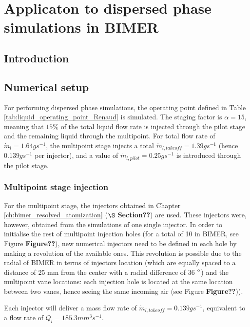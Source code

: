 \chapter{Applicaton to dispersed phase simulations in BIMER}
	\label{ch:bimer_test_bench}

\section{Introduction}

\section{Numerical setup}

For performing dispersed phase simulations, the operating point defined in Table \ref{tab:liquid_operating_point_Renaud} is simulated. The staging factor is $\alpha = 15$, meaning that $15 \%$ of the total liquid flow rate is injected through the pilot stage and the remaining liquid through the multipoint. For total flow rate of $\dot{m}_l = 1.64 g s^{-1}$, the multipoint stage injects a total $\dot{m}_{l,takeoff} = 1.39 g s^{-1}$ (hence $0.139 g s^{-1}$ per injector), and a value of $\dot{m}_{l,pilot} = 0.25 g s^{-1}$ is introduced through the pilot stage.

\subsection{Multipoint stage injection}

For the multipoint stage, the injectors obtained in Chapter \ref{ch:bimer_resolved_atomization} ($\S$ \textbf{Section??}) are used. These injectors were, however, obtained from the simulations of one single injector. In order to initialise the rest of multipoint injection holes (for a total of 10 in BIMER, see Figure \textbf{Figure??}), new numerical injectors need to be defined in each hole by making a revolution of the available ones. This revolution is possible due to the radial of BIMER in terms of injectors location (which are equally spaced to a distance of 25 mm from the center with a radial difference of 36 $\degree$) and the multipoint vane locations: each injection hole is located at the same location between two vanes, hence seeing the same incoming air (see Figure \textbf{Figure??})).

Each injector will deliver a mass flow rate of $\dot{m}_{l,takeoff} = 0.139 g s^{-1}$, equivalent to a flow rate of $Q_l = 185.3 mm^3 s^{-1}$.


